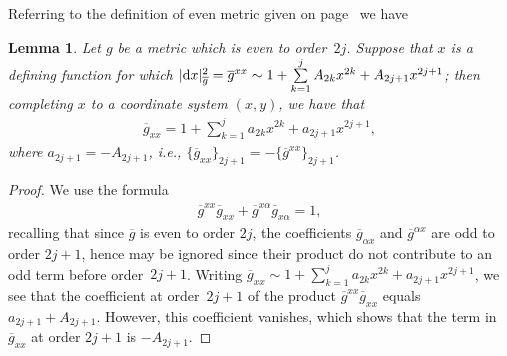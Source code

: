 \documentclass[pdftex]{sigma}
\numberwithin{equation}{section}
\newtheorem{Lemma}[Theorem]{Lemma}
\newcommand{\olg}{\overline{g}}
\newcommand{\gbar}{\overline{g}}
\begin{document}
Referring to the definition of even metric given on page~\pageref{defn-even} we have
\begin{Lemma} \label{appendix:first-odd-term-olgxx} Let $g$ be a metric which is even to order~$2j$. Suppose that $x$ is a defining function for which
$|{\rm d}x|^2_{\olg} = \olg^{xx} \sim 1 + \sum\limits_{k=1}^{j} A_{2k} x^{2k} + A_{2j+1} x^{2j+1}$; then completing $x$ to a coordinate system $(x,y)$, we have that
\begin{gather*}%
\olg_{xx} = 1 + \sum_{k=1}^{j} a_{2k} x^{2k} + a_{2j+1} x^{2j+1} ,
\end{gather*}
where $a_{2j+1} = -A_{2j+1}$, i.e., $\{ \gbar_{xx} \}_{2j+1} = - \{\gbar^{xx}\}_{2j+1}$.
\end{Lemma}
\begin{proof}We use the formula
\begin{gather*}%
\olg^{xx} \olg_{xx} + \olg^{x\alpha} \olg_{x\alpha} = 1,
\end{gather*}
recalling that since $\olg$ is even to order $2j$, the coefficients $\olg_{\alpha x}$ and $\olg^{\alpha x}$ are odd to order $2j+1$, hence may be ignored since their product do not contribute to an odd term before order~$2j+1$. Writing $\olg_{xx} \sim 1 + \sum\limits_{k=1}^{j} a_{2k} x^{2k} + a_{2j+1} x^{2j+1}$, we see that the coefficient at order~$2j+1$ of the product $\olg^{xx} \olg_{xx}$ equals $a_{2j+1} + A_{2j+1}$. However, this coefficient vanishes, which shows that the term in $\gbar_{xx} $ at order $2j+1$ is $-A_{2j+1}$.
\end{proof}
\end{document}
